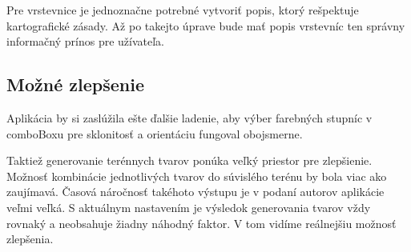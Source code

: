 \documentclass[12pt]{article}
\begin{document}
Pre vrstevnice je jednoznačne potrebné vytvoriť popis, ktorý rešpektuje kartografické zásady. Až po takejto úprave bude mať popis vrstevníc ten správny informačný prínos pre užívateľa. 

\subsection{Možné zlepšenie}
Aplikácia by si zaslúžila ešte ďalšie ladenie, aby výber farebných stupníc v comboBoxu pre sklonitosť a orientáciu fungoval obojsmerne.

Taktiež generovanie terénnych tvarov ponúka veľký priestor pre zlepšienie. Možnosť kombinácie jednotlivých tvarov do súvislého terénu by bola viac ako zaujímavá. Časová náročnosť takéhoto výstupu je v podaní autorov aplikácie veľmi veľká. S aktuálnym nastavením je výsledok generovania tvarov vždy rovnaký a neobsahuje žiadny náhodný faktor. V tom vidíme reálnejšiu možnosť zlepšenia.



\newpage

\listoffigures





\nocite{*}
{}


   
\end{document}
